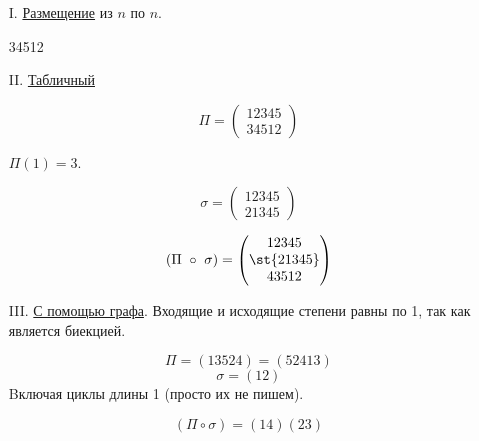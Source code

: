 \begin{enumerate}
    \item[I.] \ul{Размещение} из $n$ по $n$. 
    
    34512
    \item[II.] \ul{Табличный}
    
    \[
        \Pi = 
        \begin{pmatrix}
            1 2 3 4 5 \\
            3 4 5 1 2
        \end{pmatrix}
        \]
        
        $\Pi (1) = 3$.
        
        \[
        \sigma = 
        \begin{pmatrix}
            1 2 3 4 5 \\
            2 1 3 4 5
        \end{pmatrix}
        \]
        
        \[
        (\Pi \  \circ \  \sigma)  = 
        \begin{pmatrix}
            1 2 3 4 5 \\
            $\st{21345}$ \\
            4 3 5 1 2
        \end{pmatrix}
        \]
    \item[III.] \ul{С помощью графа}. Входящие и исходящие степени равны по 1, так как является биекцией.

    \[\Pi = (13524) = (52413)\]
    \[\sigma = (12)\] Bключая циклы длины 1 (просто их не пишем).
    
    \[(\Pi \circ \sigma) = (14)(23)\]
    
\end{enumerate}





